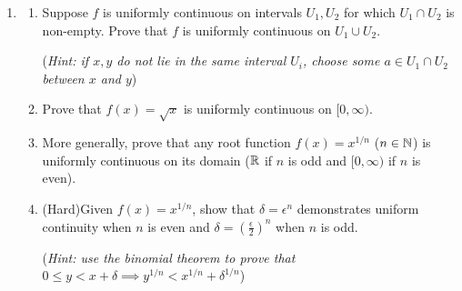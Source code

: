 \begin{exercises}{}{}
\begin{enumerate}
	  \item\label{exs:unifcontunion}\begin{enumerate}
	    \item Suppose $f$ is uniformly continuous on intervals $U_1,U_2$ for which $U_1\cap U_2$ is non-empty. Prove that $f$ is uniformly continuous on $U_1\cup U_2$.\par
	    (\emph{Hint: if $x,y$ do not lie in the same interval $U_i$, choose some $a\in U_1\cap U_2$ between $x$ and $y$})
	
			\item Prove that $f(x)=\sqrt x$ is uniformly continuous on $[0,\infty)$.
			
			\item More generally, prove that any root function $f(x)=x^{1/n}$ ($n\in\mathbb{N}$) is uniformly continuous on its domain ($\mathbb{R}$ if $n$ is odd and $[0,\infty)$ if $n$ is even).
			
			\item (Hard)\lstsp Given $f(x)=x^{1/n}$, show that $\delta=\epsilon^n$ demonstrates uniform continuity when $n$ is even and $\delta=\left(\frac\epsilon 2\right)^n$ when $n$ is odd.\par
			(\emph{Hint: use the binomial theorem to prove that $0\le y<x+\delta\implies y^{1/n}<x^{1/n}+\delta^{1/n}$})
		\end{enumerate}
	
	\end{enumerate}
\end{exercises}

\vspace{-15pt}


